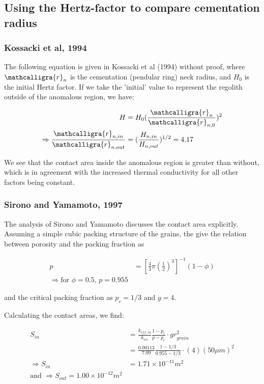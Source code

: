 \documentclass[11pt]{article} %
\newcommand{\sr}{\ensuremath{\mathcalligra{r}} \xspace}
\begin{document}
\subsection{Using the Hertz-factor to compare cementation radius}

\subsubsection{Kossacki et al, 1994}

	The following equation is given in Kossacki et al (1994) without proof, where $\sr_{n}$ is the cementation (pendular ring) neck radius, and $H_{0}$ is the initial Hertz factor. If we take the 'initial' value to represent the regolith outside of the anomalous region, we have:
	
	\begin{equation}
	\begin{split}
	H &= H_{0} (\frac{\sr_{n}}{\sr_{n,0}})^{2} \\
	\Rightarrow \frac{\sr_{n, in}}{\sr_{n, out}} &= (\frac{H_{n, in}}{H_{n, out}})^{1/2} = 4.17
	\end{split}
	\end{equation}
	
	We see that the contact area inside the anomalous region is greater than without, which is in agreement with the increased thermal conductivity for all other factors being constant. 
	
\subsubsection{Sirono and Yamamoto, 1997}

	The analysis of Sirono and Yamamoto discusses the contact area explicitly. Assuming a simple cubic packing structure of the grains, the give the relation between porosity and the packing fraction as 
	
	\begin{equation}
	\begin{split}
	p &= [ \frac{4}{3} \pi ( \frac{1}{2})^{3} ]^{-1} (1 - \phi) \\
	\Rightarrow \text{for } \phi = 0.5 \text{, } p = 0.955
	\end{split}
	\end{equation}
	
	and the critical packing fraction as $p_{c} = 1/3$ and $g = 4$. 
	
	Calculating the contact areas, we find:
	
	\begin{equation}
	\begin{split}
	S_{in} &= \frac{k_{eff, in}}{k_{ice}} \frac{1-p_{c}}{p - p_{c}}\cdot g r_{grain}^{2} \\
	&= \frac{0.00113}{7.09} \frac{1-1/3}{0.955-1/3} \cdot (4)(50 \mu m)^2 \\
	\Rightarrow S_{in} &= 1.71\times 10^{-11} m^{2} \\
	\text{and } \Rightarrow S_{out} = 1.00\times 10^{-12} m^{2}
	\end{split}
	\end{equation}
	
\end{document}
